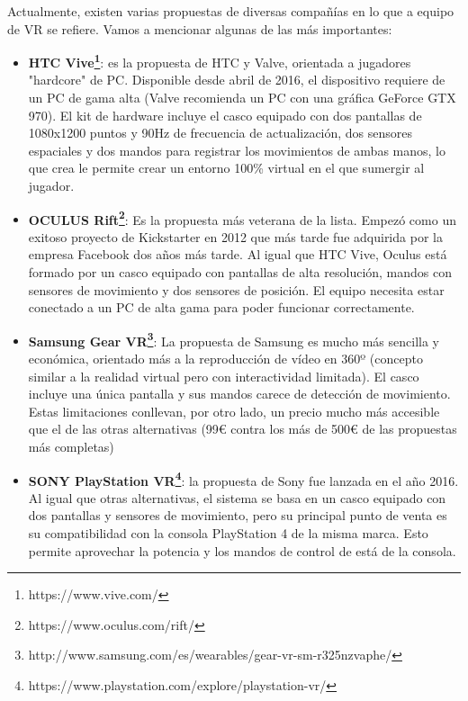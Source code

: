 Actualmente, existen varias propuestas de diversas compañías en lo que a equipo de VR se refiere. Vamos a mencionar algunas de las más importantes:
\begin{itemize}
\item \textbf{HTC Vive\footnote{https://www.vive.com/}}: es la propuesta de HTC y Valve, orientada a jugadores "hardcore" de PC. Disponible desde abril de 2016, el dispositivo requiere de un PC de gama alta (Valve recomienda un PC con una gráfica GeForce GTX 970). El kit de hardware incluye el casco equipado con dos pantallas de 1080x1200 puntos y 90Hz de frecuencia de actualización, dos sensores espaciales y dos mandos para registrar los movimientos de ambas manos, lo que crea le permite crear un entorno 100\% virtual en el que sumergir al jugador.

\item \textbf{OCULUS Rift\footnote{https://www.oculus.com/rift/}}: Es la propuesta más veterana de la lista. Empezó como un exitoso proyecto de Kickstarter en 2012 que más tarde fue adquirida por la empresa Facebook dos años más tarde. Al igual que HTC Vive, Oculus está formado por un casco equipado con pantallas de alta resolución, mandos con sensores de movimiento y dos sensores de posición. El equipo necesita estar conectado a un PC de alta gama para poder funcionar correctamente.

\item \textbf{Samsung Gear VR\footnote{http://www.samsung.com/es/wearables/gear-vr-sm-r325nzvaphe/}}: La propuesta de Samsung es mucho más sencilla y económica, orientado más a la reproducción de vídeo en 360º (concepto similar a la realidad virtual pero con interactividad limitada). El casco incluye una única pantalla y sus mandos carece de detección de movimiento. Estas limitaciones conllevan, por otro lado, un precio mucho más accesible que el de las otras alternativas (99€ contra los más de 500€ de las propuestas más completas)

\item \textbf{SONY PlayStation VR\footnote{https://www.playstation.com/explore/playstation-vr/}}: la propuesta de Sony fue lanzada en el año 2016. Al igual que otras alternativas, el sistema se basa en un casco equipado con dos pantallas y sensores de movimiento, pero su principal punto de venta es su compatibilidad con la consola PlayStation 4 de la misma marca. Esto permite aprovechar la potencia y los mandos de control de está de la consola.
\end{itemize}

